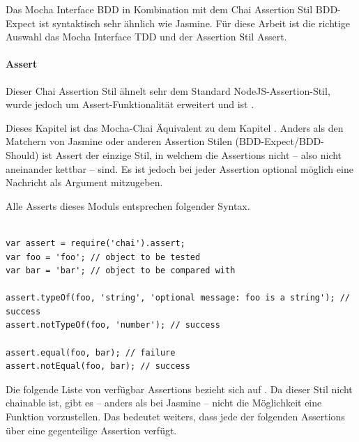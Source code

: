 Das Mocha Interface BDD in Kombination mit dem Chai Assertion Stil BDD-Expect ist syntaktisch  sehr ähnlich wie Jasmine. Für diese Arbeit ist die richtige Auswahl das Mocha Interface TDD und der Assertion Stil Assert.

\paragraph{Assert}
Dieser Chai Assertion Stil ähnelt sehr dem Standard NodeJS-Assertion-Stil, wurde jedoch um Assert-Funktionalität erweitert und ist  \autocite{Chai:AssertBrowser}.

Dieses Kapitel ist das Mocha-Chai Äquivalent zu dem Kapitel . Anders als den Matchern von Jasmine oder anderen Assertion Stilen (BDD-Expect/BDD-Should) ist Assert der einzige Stil, in welchem die Assertions nicht  -- also nicht aneinander kettbar -- sind. Es ist jedoch bei jeder Assertion optional möglich eine Nachricht als Argument mitzugeben.

Alle Asserts dieses Moduls entsprechen folgender Syntax.
\begin{lstlisting}

var assert = require('chai').assert;
var foo = 'foo'; // object to be tested
var bar = 'bar'; // object to be compared with

assert.typeOf(foo, 'string', 'optional message: foo is a string'); // success
assert.notTypeOf(foo, 'number'); // success

assert.equal(foo, bar); // failure
assert.notEqual(foo, bar); // success

\end{lstlisting}

Die folgende Liste von verfügbar Assertions bezieht sich auf \cite{Chai:Assert}. Da dieser Stil nicht chainable ist, gibt es -- anders als bei Jasmine -- nicht die Möglichkeit eine  Funktion vorzustellen. Das bedeutet weiters, dass jede der folgenden Assertions über eine gegenteilige Assertion verfügt.

